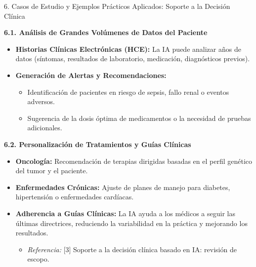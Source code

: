 \documentclass[aspectratio=169]{beamer}
\begin{document}
\begin{frame}[fragile]{6. Casos de Estudio y Ejemplos Prácticos Aplicados: Soporte a la Decisión Clínica}


\textbf{6.1. Análisis de Grandes Volúmenes de Datos del Paciente}
\begin{itemize}
  \item \textbf{Historias Clínicas Electrónicas (HCE):} La IA puede analizar años de datos (síntomas, resultados de laboratorio, medicación, diagnósticos previos).
  \item \textbf{Generación de Alertas y Recomendaciones:}
  \begin{itemize}
    \item Identificación de pacientes en riesgo de sepsis, fallo renal o eventos adversos.
    \item Sugerencia de la dosis óptima de medicamentos o la necesidad de pruebas adicionales.
  \end{itemize}
\end{itemize}
\textbf{6.2. Personalización de Tratamientos y Guías Clínicas}
\begin{itemize}
  \item \textbf{Oncología:} Recomendación de terapias dirigidas basadas en el perfil genético del tumor y el paciente.
  \item \textbf{Enfermedades Crónicas:} Ajuste de planes de manejo para diabetes, hipertensión o enfermedades cardíacas.
  \item \textbf{Adherencia a Guías Clínicas:} La IA ayuda a los médicos a seguir las últimas directrices, reduciendo la variabilidad en la práctica y mejorando los resultados.
  \begin{itemize}
    \item \textit{Referencia:} [3] Soporte a la decisión clínica basado en IA: revisión de escopo.
  \end{itemize}
\end{itemize}
\end{frame}
\end{document}
